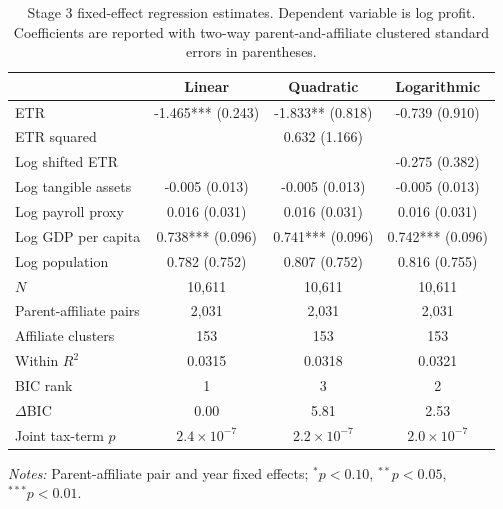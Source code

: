 \begin{table}[H]
\centering
\small
\setlength{\tabcolsep}{4pt}
\caption[Stage 3 fixed-effect regression estimates]{Stage 3 fixed-effect regression estimates. Dependent variable is log profit. Coefficients are reported with two-way parent-and-affiliate clustered standard errors in parentheses.}
\label{tab:stage3_regression_table}
\begin{tabular}{@{}lccc@{}}
\toprule
 & Linear & Quadratic & Logarithmic \\
\midrule
ETR & -1.465*** (0.243) & -1.833** (0.818) & -0.739 (0.910) \\
ETR squared &  &  0.632 (1.166) &  \\
Log shifted ETR &  &  & -0.275 (0.382) \\
Log tangible assets & -0.005 (0.013) & -0.005 (0.013) & -0.005 (0.013) \\
Log payroll proxy &  0.016 (0.031) &  0.016 (0.031) &  0.016 (0.031) \\
Log GDP per capita &  0.738*** (0.096) &  0.741*** (0.096) &  0.742*** (0.096) \\
Log population &  0.782 (0.752) &  0.807 (0.752) &  0.816 (0.755) \\
\midrule
$N$ & 10,611 & 10,611 & 10,611 \\
Parent-affiliate pairs &  2,031 &  2,031 &  2,031 \\
Affiliate clusters &    153 &    153 &    153 \\
Within $R^2$ &      0.0315 &      0.0318 &      0.0321 \\
BIC rank &      1 &      3 &      2 \\
$\Delta$BIC &      0.00 &      5.81 &      2.53 \\
Joint tax-term $p$ & $2.4 \times 10^{-7}$ & $2.2 \times 10^{-7}$ & $2.0 \times 10^{-7}$ \\
\bottomrule
\end{tabular}

\vspace{0.35em}
\noindent\begin{minipage}{\textwidth}
\footnotesize\raggedright\textit{Notes:} Parent-affiliate pair and year fixed effects; $^{*}p<0.10$, $^{**}p<0.05$, $^{***}p<0.01$.
\end{minipage}
\end{table}
